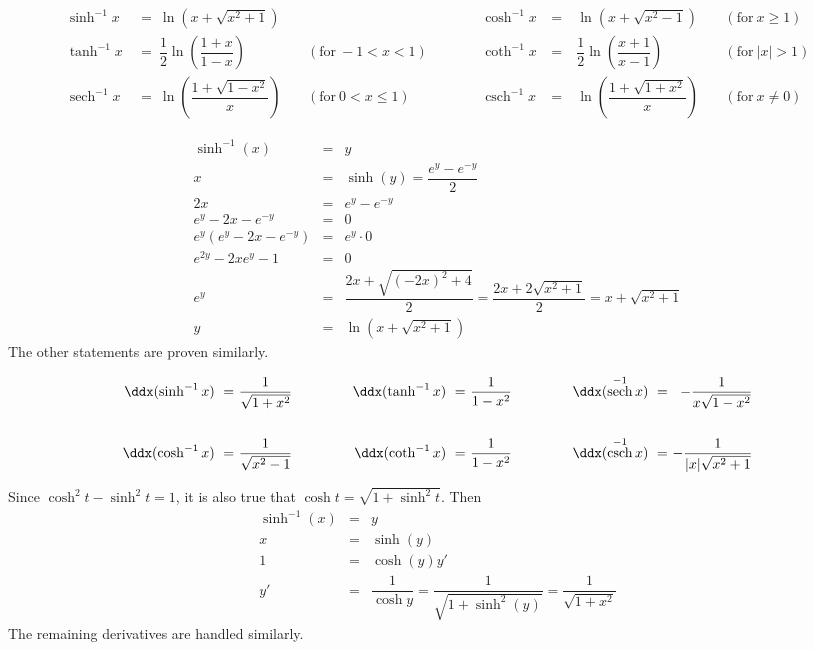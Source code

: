 \documentclass{book}
\DeclareMathOperator{\sech}{sech}
\DeclareMathOperator{\csch}{csch}
\begin{document}
\begin{Prop}\mbox{}
\[\begin{alignedat}{100}
\sinh^{-1} x\ &=\  \ln\left(x+\sqrt{x^2+1}\right)\ &&&\qquad& 
\cosh^{-1} x\ &=\  &\ln\left(x+\sqrt{x^2-1}\right)\ && (\text{for}\ x\ge 1)\\
\tanh^{-1} x\ &=\  \dfrac{1}{2}\ln\left(\dfrac{1+x}{1-x}\right)\ && (\text{for}\ -1<x<1)\   &\qquad& 
\coth^{-1} x\ &=\  & \dfrac{1}{2}\ln\left(\dfrac{x+1}{x-1}\right)\ && (\text{for}\ |x|>1)\\
\sech^{-1} x\ &=\  \ln\left(\dfrac{1+\sqrt{1-x^2}}{x}\right)\ && (\text{for}\ 0< x \le 1) &\qquad& 
\csch^{-1} x\ &=\  & \ln\left(\dfrac{1+\sqrt{1+x^2}}{x}\right)\ && (\text{for}\ x\neq 0)
\end{alignedat}\]
\end{Prop}
\begin{pf}\mbox{}\vspace{-30pt}

\begin{eqnarray*}
\sinh^{-1}(x) &=& y\\
x &=& \sinh(y) = \dfrac{e^y-e^{-y}}{2}\\
2x &=& e^y - e^{-y}\\
e^y-2x-e^{-y} &=&0\\
e^y(e^y-2x-e^{-y}) &=& e^y\cdot 0\\
e^{2y} - 2xe^y-1 &=& 0\\
e^y &=& \dfrac{2x+ \sqrt{(-2x)^2+4}}{2} = \dfrac{2x+2\sqrt{x^2+1}}{2} = x+\sqrt{x^2+1}\\
y &=& \ln\left(x+\sqrt{x^2+1}\right)
\end{eqnarray*}
The other statements are proven similarly.
\end{pf}\vs

\begin{Prop} 
\[\begin{alignedat}{100}
\ddx(\sinh^{-1} x)\ &=\ & \dfrac{1}{\sqrt{1+x^2}}\ &\qquad\qquad& 
\ddx(\tanh^{-1} x)\ &=\ & \dfrac{1}{1-x^2} \ &\qquad\qquad& 
\ddx(\sech^{-1} x)\ &=\ & -\dfrac{1}{x\sqrt{1-x^2}}\\\\
\ddx(\cosh^{-1} x)\ &=\ & \dfrac{1}{\sqrt{x^2-1}}\ &\qquad\qquad& 
\ddx(\coth^{-1} x)\ &=\ & \dfrac{1}{1-x^2}\ &\qquad\qquad& 
\ddx(\csch^{-1} x)\ &=\ & -\dfrac{1}{|x|\sqrt{x^2+1}}
\end{alignedat}\]
\end{Prop}
\begin{pf}
Since $\cosh^2 t - \sinh^2 t = 1$, it is also true that $\cosh t = \sqrt{1+\sinh^2 t}$. Then
\begin{eqnarray*}
\sinh^{-1}(x) &=& y\\
x &=& \sinh(y)\\
1 &=& \cosh(y)y'\\
y' &=& \dfrac{1}{\cosh y} = \dfrac{1}{\sqrt{1+\sinh^2(y)}} = \dfrac{1}{\sqrt{1+x^2}}
\end{eqnarray*}
The remaining derivatives are handled similarly.
\end{pf}\vs
\end{document}
